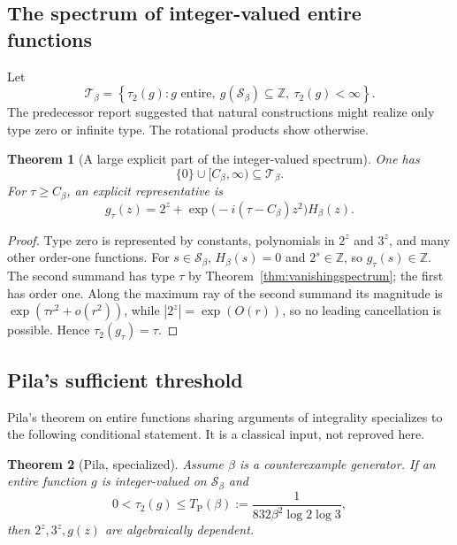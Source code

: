 \documentclass[11pt,oneside]{article}
\newtheorem{theorem}{Theorem}[section]
\theoremstyle{definition}
\theoremstyle{remark}
\newcommand{\Z}{\mathbb Z}
\newcommand{\Sbeta}{\mathcal S_\beta}
\newcommand{\Tclass}{\mathcal T}
\newcommand{\Cbeta}{C_\beta}
\newcommand{\TP}{T_{\mathrm P}(\beta)}
\begin{document}
\subsection{The spectrum of integer-valued entire functions}

Let
\[
 \Tclass_\beta=
 \left\{\tau_2(g):
 g\text{ entire},\ g(\Sbeta)\subseteq\Z,\ \tau_2(g)<\infty\right\}.
\]
The predecessor report suggested that natural constructions might realize only type zero
or infinite type.  The rotational products show otherwise.

\begin{theorem}[A large explicit part of the integer-valued spectrum]
\label{thm:integerspectrum}
One has
\begin{equation}
 \{0\}\cup[\Cbeta,\infty)\subseteq\Tclass_\beta.
 \label{eq:integerspectrum}
\end{equation}
For $\tau\ge\Cbeta$, an explicit representative is
\begin{equation}
 g_\tau(z)=2^z+
 \exp\bigl(-i(\tau-\Cbeta)z^2\bigr)H_\beta(z).
 \label{eq:gtau}
\end{equation}
\end{theorem}

\begin{proof}
Type zero is represented by constants, polynomials in $2^z$ and $3^z$, and many other
order-one functions.  For $s\in\Sbeta$, $H_\beta(s)=0$ and $2^s\in\Z$, so
$g_\tau(s)\in\Z$.  The second summand has type $\tau$ by
Theorem~\ref{thm:vanishingspectrum}; the first has order one.  Along the maximum ray of the
second summand its magnitude is $\exp(\tau r^2+o(r^2))$, while $|2^z|=\exp(O(r))$, so no
leading cancellation is possible.  Hence $\tau_2(g_\tau)=\tau$.
\end{proof}

\subsection{Pila's sufficient threshold}

Pila's theorem on entire functions sharing arguments of integrality specializes to the
following conditional statement.  It is a classical input, not reproved here.

\begin{theorem}[Pila, specialized]
\label{thm:pila}
Assume $\beta$ is a counterexample generator.  If an entire function $g$ is integer-valued
on $\Sbeta$ and
\begin{equation}
 0<\tau_2(g)\le
 \TP:=\frac{1}{832\beta^2\log2\log3},
 \label{eq:TP}
\end{equation}
then $2^z,3^z,g(z)$ are algebraically dependent.
\end{theorem}
\end{document}
